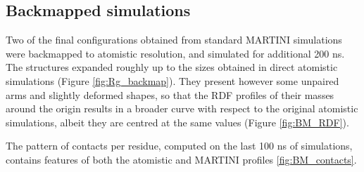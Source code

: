 \subsection{Backmapped simulations} 

Two of the final configurations obtained from standard MARTINI simulations were backmapped to atomistic resolution, and simulated for additional 200 ns. The structures expanded roughly up to the sizes obtained in direct atomistic simulations (Figure \ref{fig:Rg_backmap}). They present however some unpaired arms and slightly deformed shapes, so that the RDF profiles of their masses around the origin results in a broader curve with respect to the original atomistic simulations, albeit they are centred at the same values (Figure \ref{fig:BM_RDF}).

The pattern of contacts per residue, computed on the last 100 ns of simulations, contains features of both the atomistic and MARTINI profiles \ref{fig:BM_contacts}.
%
